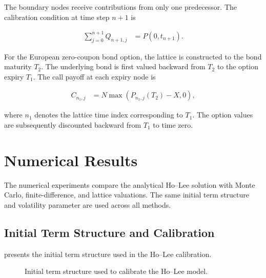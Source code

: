 \documentclass[11pt,a4paper]{article}
\numberwithin{equation}{section}
\begin{document}
The boundary nodes receive contributions from only one predecessor. The
calibration condition at time step $n+1$ is

\begin{align*}
    \sum_{j=0}^{n+1}Q_{n+1,j}
    &=
    P(0,t_{n+1}).
\end{align*}

For the European zero-coupon bond option, the lattice is constructed to
the bond maturity $T_2$. The underlying bond is first valued backward
from $T_2$ to the option expiry $T_1$. The call payoff at each expiry
node is

\begin{align*}
    C_{n_1,j}
    &=
    N\max\left(P_{n_1,j}(T_2)-X,0\right),
\end{align*}

where $n_1$ denotes the lattice time index corresponding to $T_1$. The
option values are subsequently discounted backward from $T_1$ to time
zero.


\section{Numerical Results}

The numerical experiments compare the analytical Ho--Lee solution with
Monte Carlo, finite-difference, and lattice valuations. The same initial
term structure and volatility parameter are used across all methods.


\subsection{Initial Term Structure and Calibration}

 presents the initial term structure used in the Ho--Lee
calibration.

\begin{figure}[H]
    \centering



    \caption{Initial term structure used to calibrate the Ho--Lee model.}
    \label{fig:curve}
\end{figure}
\end{document}
